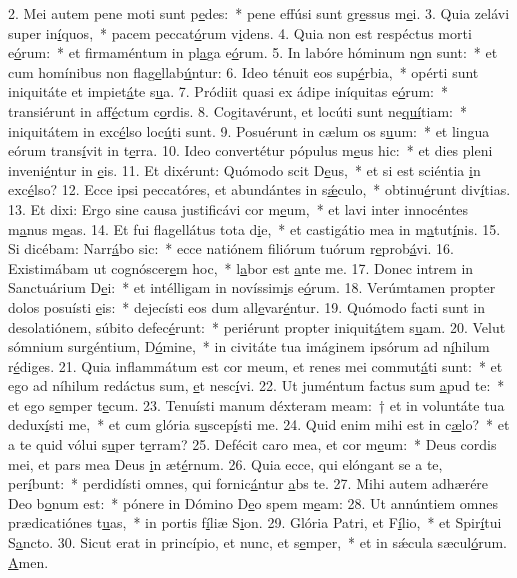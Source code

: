 2. Mei autem pene moti sunt p\uline{e}des:~* pene effúsi sunt gr\uline{e}ssus m\uline{e}i.
3. Quia zelávi super in\uline{í}quos,~* pacem peccat\uline{ó}rum v\uline{i}dens.
4. Quia non est respéctus morti e\uline{ó}rum:~* et firmaméntum in pl\uline{a}ga e\uline{ó}rum.
5. In labóre hóminum n\uline{o}n sunt:~* et cum homínibus non flag\uline{e}llab\uline{ú}ntur:
6. Ideo ténuit eos sup\uline{é}rbia,~* opérti sunt iniquitáte et impiet\uline{á}te s\uline{u}a.
7. Pródiit quasi ex ádipe iníquitas e\uline{ó}rum:~* transiérunt in aff\uline{é}ctum c\uline{o}rdis.
8. Cogitavérunt, et locúti sunt ne\uline{quí}tiam:~* iniquitátem in exc\uline{é}lso loc\uline{ú}ti sunt.
9. Posuérunt in cælum os s\uline{u}um:~* et lingua eórum trans\uline{í}vit in t\uline{e}rra.
10. Ideo convertétur pópulus m\uline{e}us hic:~* et dies pleni inveni\uline{é}ntur in \uline{e}is.
11. Et dixérunt: Quómodo scit D\uline{e}us,~* et si est sciéntia \uline{i}n exc\uline{é}lso?
12. Ecce ipsi peccatóres, et abundántes in s\uline{ǽ}culo,~* obtinu\uline{é}runt div\uline{í}tias.
13. Et dixi: Ergo sine causa justificávi cor m\uline{e}um,~* et lavi inter innocéntes m\uline{a}nus m\uline{e}as.
14. Et fui flagellátus tota d\uline{i}e,~* et castigátio mea in m\uline{a}tut\uline{í}nis.
15. Si dicébam: Narr\uline{á}bo sic:~* ecce natiónem filiórum tuórum r\uline{e}prob\uline{á}vi.
16. Existimábam ut cognóscer\uline{e}m hoc,~* l\uline{a}bor est \uline{a}nte me.
17. Donec intrem in Sanctuárium D\uline{e}i:~* et intélligam in novíssim\uline{i}s e\uline{ó}rum.
18. Verúmtamen propter dolos posuísti \uline{e}is:~* dejecísti eos dum all\uline{e}var\uline{é}ntur.
19. Quómodo facti sunt in desolatiónem, súbito defec\uline{é}runt:~* periérunt propter iniquit\uline{á}tem s\uline{u}am.
20. Velut sómnium surgéntium, D\uline{ó}mine,~* in civitáte tua imáginem ipsórum ad n\uline{í}hilum r\uline{é}diges.
21. Quia inflammátum est cor meum, et renes mei commut\uline{á}ti sunt:~* et ego ad níhilum redáctus sum, \uline{e}t nesc\uline{í}vi.
22. Ut juméntum factus sum \uline{a}pud te:~* et ego s\uline{e}mper t\uline{e}cum.
23. Tenuísti manum déxteram meam:~† et in voluntáte tua dedux\uline{í}sti me,~* et cum glória s\uline{u}scep\uline{í}sti me.
24. Quid enim mihi est in c\uline{æ}lo?~* et a te quid vólui s\uline{u}per t\uline{e}rram?
25. Defécit caro mea, et cor m\uline{e}um:~* Deus cordis mei, et pars mea Deus \uline{i}n æt\uline{é}rnum.
26. Quia ecce, qui elóngant se a te, per\uline{í}bunt:~* perdidísti omnes, qui fornic\uline{á}ntur \uline{a}bs te.
27. Mihi autem adhærére Deo b\uline{o}num est:~* pónere in Dómino D\uline{e}o spem m\uline{e}am:
28. Ut annúntiem omnes prædicatiónes t\uline{u}as,~* in portis f\uline{í}liæ S\uline{i}on.
29. Glória Patri, et F\uline{í}lio,~* et Spir\uline{í}tui S\uline{a}ncto.
30. Sicut erat in princípio, et nunc, et s\uline{e}mper,~* et in sǽcula sæcul\uline{ó}rum. \uline{A}men.
